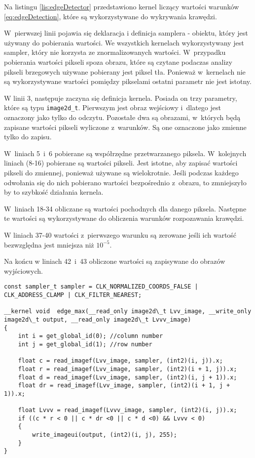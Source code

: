 Na listingu \ref{lis:edgeDetector} przedstawiono kernel liczący wartości warunków \eqref{eq:edgeDetection}, które są wykorzystywane do wykrywania krawędzi. 

W~pierwszej linii pojawia się deklaracja i definicja samplera - obiektu, który jest używany do pobierania wartości. We wszystkich kernelach wykorzystywany jest sampler, który nie korzysta ze znormalizowanych wartości. W~przypadku pobierania wartości pikseli spoza obrazu, które są czytane podaczas analizy pikseli brzegowych używane pobierany jest piksel tła. Ponieważ w~kernelach nie są wykorzystywane wartości pomiędzy pikselami ostatni parametr nie jest istotny.

W linii 3, następuje zaczyna się definicja kernela. Posiada on trzy parametry, które są typu \texttt{image2d\_t}. Pierwszym jest obraz wejściowy i~dlatego jest oznaczony jako tylko do odczytu. Pozostałe dwa są obrazami, w~których będą zapisane wartości pikseli wyliczone z~warunków. Są one oznaczone jako zmienne tylko do zapisu.

W~liniach 5~i~6 pobierane są współrzędne przetwarzanego piksela. W~kolejnych liniach (8-16) pobierane są wartości pikseli. Jest istotne, aby zapisać wartości pikseli do zmiennej, ponieważ używane są wielokrotnie. Jeśli podczas każdego odwołania się do nich pobierano wartości bezpośrednio z~obrazu, to zmniejszyło by to szybkość działania kernela.

W~liniach 18-34 obliczane są wartości pochodnych dla danego piksela. Następne te wartości są wykorzystywane do  obliczenia warunków rozpozawania krawędzi.

W liniach 37-40 wartości z~pierwszego warunku są zerowane jeśli ich wartość bezwzględna jest mniejsza niż $  10^{-5} $.

Na końcu w liniach 42~i~43 obliczone wartości są zapisywane do obrazów wyjściowych.

\begin{lstlisting}
const sampler_t sampler = CLK_NORMALIZED_COORDS_FALSE | CLK_ADDRESS_CLAMP | CLK_FILTER_NEAREST;

__kernel void  edge_max(__read_only image2d\_t Lvv_image, __write_only image2d\_t output, __read_only image2d\_t Lvvv_image)
{
	int i = get_global_id(0); //column number
	int j = get_global_id(1); //row number

	float c = read_imagef(Lvv_image, sampler, (int2)(i, j)).x;
	float r = read_imagef(Lvv_image, sampler, (int2)(i + 1, j)).x;
	float d = read_imagef(Lvv_image, sampler, (int2)(i, j + 1)).x;
	float dr = read_imagef(Lvv_image, sampler, (int2)(i + 1, j + 1)).x;
	
	float Lvvv = read_imagef(Lvvv_image, sampler, (int2)(i, j)).x;
	if ((c * r < 0 || c * dr <0 || c * d <0) && Lvvv < 0)
	{
		write_imageui(output, (int2)(i, j), 255);
	}
}
\end{lstlisting}

